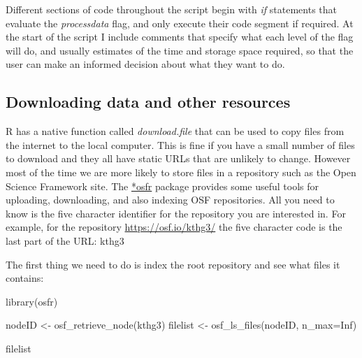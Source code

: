 \documentclass[
]{article}
\newenvironment{Shaded}{\begin{snugshade}}{\end{snugshade}}
\newcommand{\AttributeTok}[1]{\textcolor[rgb]{0.77,0.63,0.00}{#1}}
\newcommand{\ConstantTok}[1]{\textcolor[rgb]{0.00,0.00,0.00}{#1}}
\newcommand{\FunctionTok}[1]{\textcolor[rgb]{0.00,0.00,0.00}{#1}}
\newcommand{\NormalTok}[1]{#1}
\newcommand{\OtherTok}[1]{\textcolor[rgb]{0.56,0.35,0.01}{#1}}
\newcommand{\StringTok}[1]{\textcolor[rgb]{0.31,0.60,0.02}{#1}}
\begin{document}
Different sections of code throughout the script begin with \emph{if} statements that evaluate the \emph{processdata} flag, and only execute their code segment if required. At the start of the script I include comments that specify what each level of the flag will do, and usually estimates of the time and storage space required, so that the user can make an informed decision about what they want to do.

\hypertarget{downloading-data-and-other-resources}{%
\subsection{Downloading data and other resources}\label{downloading-data-and-other-resources}}

R has a native function called \emph{download.file} that can be used to copy files from the internet to the local computer. This is fine if you have a small number of files to download and they all have static URLs that are unlikely to change. However most of the time we are more likely to store files in a repository such as the Open Science Framework site. The \href{https://cran.r-project.org/package=osfr}{*osfr} package provides some useful tools for uploading, downloading, and also indexing OSF repositories. All you need to know is the five character identifier for the repository you are interested in. For example, for the repository \url{https://osf.io/kthg3/} the five character code is the last part of the URL: kthg3

The first thing we need to do is index the root repository and see what files it contains:

\begin{Shaded}
\begin{Highlighting}[]
\FunctionTok{library}\NormalTok{(osfr)}

\NormalTok{nodeID }\OtherTok{\textless{}{-}} \FunctionTok{osf\_retrieve\_node}\NormalTok{(}\StringTok{\textquotesingle{}kthg3\textquotesingle{}}\NormalTok{)}
\NormalTok{filelist }\OtherTok{\textless{}{-}} \FunctionTok{osf\_ls\_files}\NormalTok{(nodeID, }\AttributeTok{n\_max=}\ConstantTok{Inf}\NormalTok{)}

\NormalTok{filelist}
\end{Highlighting}
\end{Shaded}
\end{document}
